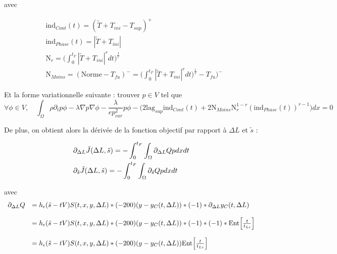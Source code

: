 \documentclass[11pt,a4paper]{article}
\begin{document}
avec 

\begin{equation}
\begin{aligned}
&\textrm{ind}_{Cont}(t)=(\tilde{T}+T_{ini}-T_{sup})^+ \\
&\textrm{ind}_{Phase}(t)=|\tilde{T}+T_{ini}| \\
& \textrm{N}_r=\Big(\int_{0}^{t_F}|\tilde{T}+T_{ini}|^rdt\Big)^{\frac{1}{r}}\\
&\textrm{N}_{Moins}=(\textrm{Norme}-T_{fu})^-=\Big(\int_{0}^{t_F}|\tilde{T}+T_{ini}|^rdt\Big)^{\frac{1}{r}}-T_{fu}\Big)^-
\end{aligned}
\end{equation}

Et la forme variationnelle suivante : trouver $p\in V$ tel que
\begin{equation}
\forall \phi\in V, \quad \int_{\Omega}\rho\partial_t p\phi-\lambda\nabla p\nabla \phi-\frac{\lambda}{ep_{car}^2} p \phi -\Big(2\textrm{lag}_{sup}\textrm{ind}_{Cont}(t)+2\textrm{N}_{Moins}\textrm{N}_r^{1-r}(\textrm{ind}_{Phase}(t))^{r-1}\Big)dx=0
\end{equation}


De plus, on obtient alors la dérivée de la fonction objectif par rapport à $\Delta L$ et $\tilde s$ :

\begin{equation}
\begin{aligned}
&\partial_{\Delta L}\tilde{J}(\Delta L, \tilde s)=-\int_{0}^{t_F}\int_{\Omega} \partial_{\Delta L} Q p dxdt \\
&\partial_{\tilde s}\tilde{J}(\Delta L, \tilde s)=-\int_{0}^{t_F}\int_{\Omega} \partial_{\tilde s} Q p dxdt 
\end{aligned}
\end{equation}

avec 
\begin{equation}
\begin{array}{ll}
\partial_{\Delta L} Q&=h_{\epsilon}(\tilde{s}-tV)S(t,x,y,\Delta L)*(-200)(y-y_C(t,\Delta L))*(-1)*\partial_{\Delta L}y_C(t,\Delta L)\\
\\
\, & =h_{\epsilon}(\tilde{s}-tV)S(t,x,y,\Delta L)*(-200)(y-y_C(t,\Delta L))*(-1)*(-1)*\textrm{Ent}\Big[\frac{t}{t_{Li}}\Big] \\
\\
\, & =h_{\epsilon}(\tilde{s}-tV)S(t,x,y,\Delta L)*(-200)(y-y_C(t,\Delta L))\textrm{Ent}\Big[\frac{t}{t_{Li}}\Big] 
\end{array} 
\end{equation}
\end{document}
